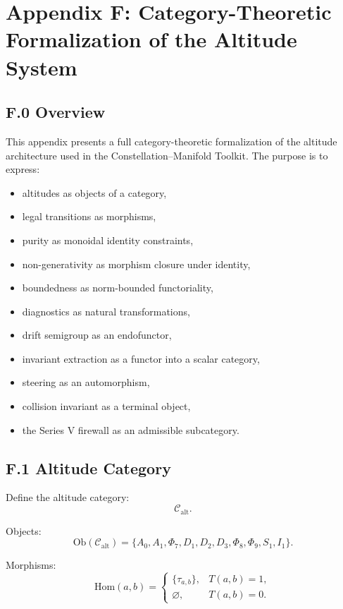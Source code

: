 \appendix
\section*{Appendix F: Category-Theoretic Formalization of the Altitude System}

\subsection*{F.0 Overview}

This appendix presents a full category-theoretic formalization of the
altitude architecture used in the Constellation–Manifold Toolkit.
The purpose is to express:
\begin{itemize}
    \item altitudes as objects of a category,
    \item legal transitions as morphisms,
    \item purity as monoidal identity constraints,
    \item non-generativity as morphism closure under identity,
    \item boundedness as norm-bounded functoriality,
    \item diagnostics as natural transformations,
    \item drift semigroup as an endofunctor,
    \item invariant extraction as a functor into a scalar category,
    \item steering as an automorphism,
    \item collision invariant as a terminal object,
    \item the Series V firewall as an admissible subcategory.
\end{itemize}

\subsection*{F.1 Altitude Category}

Define the altitude category:
\[
\mathcal{C}_{\mathrm{alt}}.
\]

Objects:
\[
\mathrm{Ob}(\mathcal{C}_{\mathrm{alt}}) =
\{A_0, A_1, \Phi_7, D_1, D_2, D_3, \Phi_8, \Phi_9, S_1, I_1\}.
\]

Morphisms:
\[
\mathrm{Hom}(a,b) =
\begin{cases}
\{\tau_{a,b}\}, & T(a,b)=1, \\
\varnothing, & T(a,b)=0.
\end{cases}
\]

